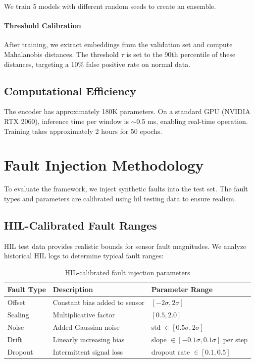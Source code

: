We train 5 models with different random seeds to create an ensemble.

\paragraph{Threshold Calibration}

After training, we extract embeddings from the validation set and compute Mahalanobis distances. The threshold $\tau$ is set to the 90th percentile of these distances, targeting a 10\% false positive rate on normal data.

\subsection{Computational Efficiency}

The encoder has approximately 180K parameters. On a standard GPU (NVIDIA RTX 2060), inference time per window is $\sim$0.5 ms, enabling real-time operation. Training takes approximately 2 hours for 50 epochs.

\section{Fault Injection Methodology}

To evaluate the framework, we inject synthetic faults into the test set. The fault types and parameters are calibrated using \gls{hil} testing data to ensure realism.

\subsection{HIL-Calibrated Fault Ranges}

HIL test data provides realistic bounds for sensor fault magnitudes. We analyze historical HIL logs to determine typical fault ranges:

\begin{table}[htbp]
\centering
\caption{HIL-calibrated fault injection parameters}
\label{tab:fault_params}
\begin{tabular}{@{}lll@{}}
\toprule
Fault Type & Description & Parameter Range \\
\midrule
Offset & Constant bias added to sensor & $[-2\sigma, 2\sigma]$ \\
Scaling & Multiplicative factor & $[0.5, 2.0]$ \\
Noise & Added Gaussian noise & std $\in [0.5\sigma, 2\sigma]$ \\
Drift & Linearly increasing bias & slope $\in [-0.1\sigma, 0.1\sigma]$ per step \\
Dropout & Intermittent signal loss & dropout rate $\in [0.1, 0.5]$ \\
\bottomrule
\end{tabular}
\end{table}

